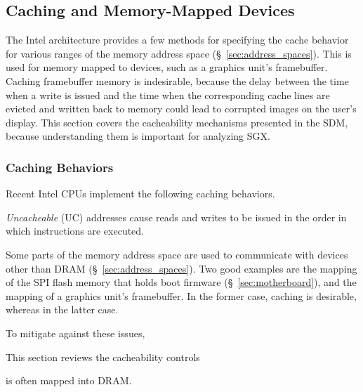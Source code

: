 \subsection{Caching and Memory-Mapped Devices}
\label{sec:memory_io}

The Intel architecture provides a few methods for specifying the cache behavior
for various ranges of the memory address space (\S~\ref{sec:address_spaces}).
This is used for memory mapped to devices, such as a graphics unit's
framebuffer. Caching framebuffer memory is indesirable, because the delay
between the time when a write is issued and the time when the corresponding
cache lines are evicted and written back to memory could lead to corrupted
images on the user's display. This section covers the cacheability mechanisms
presented in the SDM, because understanding them is important for analyzing
SGX.

\subsubsection{Caching Behaviors}

Recent Intel CPUs implement the following caching behaviors.

\textit{Uncacheable} (UC) addresses cause reads and writes to be issued in the
order in which instructions are executed.


Some parts of the memory address space are used to communicate with devices
other than DRAM (\S~\ref{sec:address_spaces}). Two good examples are the
mapping of the SPI flash memory that holds boot firmware
(\S~\ref{sec:motherboard}), and the mapping of a graphics unit's framebuffer.
In the former case, caching is desirable, whereas in the latter case.

To mitigate against these issues,


This section reviews the cacheability controls

is often mapped
into DRAM.
